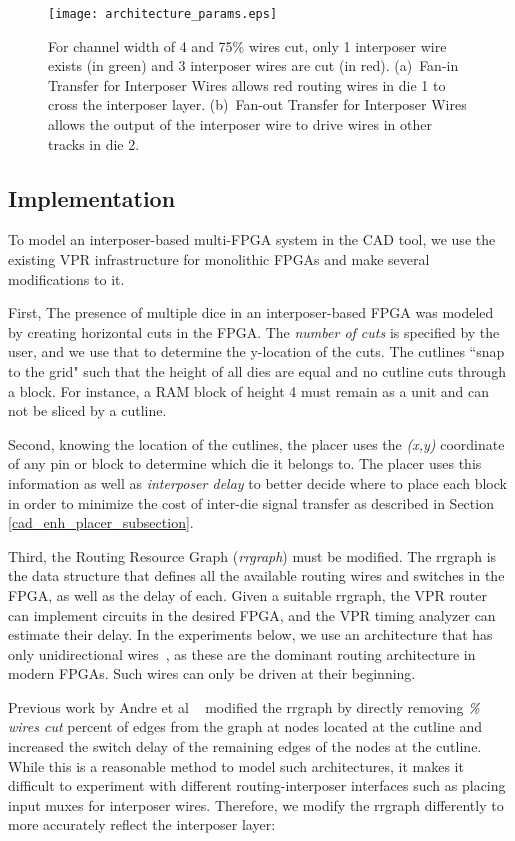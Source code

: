 \documentclass{sig-alternate-2013}
\begin{document}
\begin{figure}[!htbp]
\centering
\texttt{[image: architecture\_params.eps]}
\caption{For channel width of 4 and 75\% wires cut, only 1 interposer wire exists (in green) and 3 interposer wires are cut (in red). (a)~Fan-in Transfer for Interposer Wires allows red routing wires in die 1  to cross the interposer layer. (b)~Fan-out Transfer for Interposer Wires allows the output of the interposer wire to drive wires in other tracks in die 2.}
\label{fig:architecture_params}
\end{figure}



\subsection{Implementation}
To model an interposer-based multi-FPGA system in the CAD tool, we use the existing VPR infrastructure for monolithic FPGAs and make several modifications to it.

First, The presence of multiple dice in an interposer-based FPGA was modeled by creating horizontal cuts in the FPGA. The \textit{number of cuts} is specified by the user, and we use that to determine the y-location of the cuts. The cutlines ``snap to the grid" such that the height of all dies are equal and no cutline cuts through a block. For instance, a RAM block of height 4 must remain as a unit and can not be sliced by a cutline.

Second, knowing the location of the cutlines, the placer uses the \textit{(x,y)} coordinate of any pin or block to determine which die it belongs to. The placer uses this information as well as \textit{interposer delay} to better decide where to place each block in order to minimize the cost of inter-die signal transfer as described in Section \ref{cad_enh_placer_subsection}.

Third, the Routing Resource Graph (\textit{rrgraph}) must be modified. The rrgraph is the data structure that defines all the available routing wires and switches in the FPGA, as well as the delay of each. Given a suitable rrgraph, the VPR router can implement circuits in the desired FPGA, and the VPR timing analyzer can estimate their delay. In the experiments below, we use an architecture that has only unidirectional wires~\cite{unidirectional}, as these are the dominant routing architecture in modern FPGAs. Such wires can only be driven at their beginning. 

Previous work by Andre et al ~\cite{hahn2014cad} modified the rrgraph by directly removing \textit{\% wires cut} percent of edges from the graph at nodes located at the cutline and increased the switch delay of the remaining edges of the nodes at the cutline. While this is a reasonable method to model such architectures, it makes it difficult to experiment with different routing-interposer interfaces such as placing input muxes for interposer wires. Therefore, we modify the rrgraph differently to more accurately reflect the interposer layer:
\end{document}
